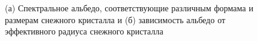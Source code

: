 \documentclass[a4paper, fontsize=14pt]{scrartcl}
\begin{document}
\begin{figure}[h]
    \begin{minipage}[h]{0.5\linewidth}
    \end{minipage}
    \hfill
    \begin{minipage}[h]{0.5\linewidth}
    \end{minipage}
    \caption{(а) Спектральное альбедо, соответствующие различным формама и размерам снежного кристалла и (б) зависимость альбедо от эффективного радиуса снежного кристалла}
    \label{fig:image}
\end{figure}
\end{document}
